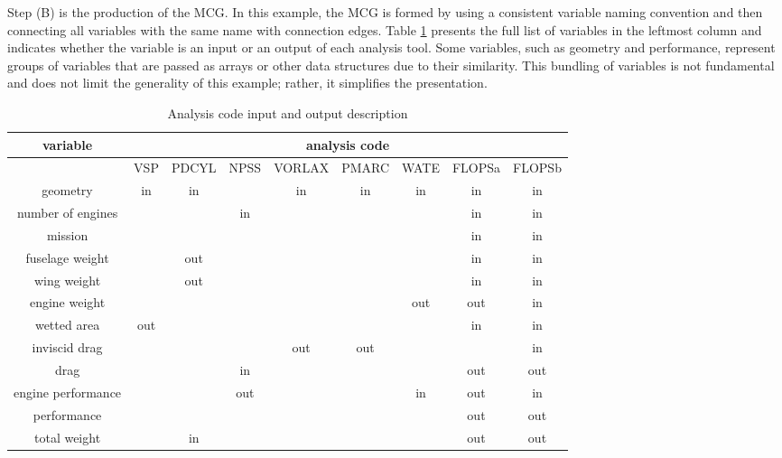 Step (B) is the production of the MCG.
	In this example, the MCG is formed by using a consistent variable naming convention and then connecting all variables with the same name with connection edges. 
	Table \ref{t:ins and outs} presents the full list of variables in the leftmost column and indicates whether the variable is an input or an output of each analysis tool. 
	Some variables, such as geometry and performance, represent groups of variables that are passed as arrays or other data structures due to their similarity. 
	This bundling of variables is not fundamental and does not limit the generality of this example; rather, it simplifies the presentation.
	\begin{table}[htb!]
	  \centering
	  \caption{Analysis code input and output description}
		\begin{tabular}{ccccccccc}
		\toprule
		variable & \multicolumn{8}{c}{analysis code} \\
		\midrule
			  & VSP   & PDCYL & NPSS  & VORLAX & PMARC & WATE  & FLOPSa & FLOPSb \\
		geometry & in    & in    &       & in    & in    & in    & in    & in \\
		number of engines &       &       & in    &       &       &       & in    & in \\
		mission &       &       &       &       &       &       & in    & in \\
		fuselage weight &       & out   &       &       &       &       & in    & in \\
		wing weight &       & out   &       &       &       &       & in    & in \\
		engine weight &       &       &       &       &       & out   & out   & in \\
		wetted area & out   &       &       &       &       &       & in    & in \\
		inviscid drag &       &       &       & out   & out   &       &       & in \\
		drag  &       &       & in    &       &       &       & out   & out \\
		engine performance &       &       & out   &       &       & in    & out   & in \\
		performance &       &       &       &       &       &       & out   & out \\
		total weight &       & in    &       &       &       &       & out   & out \\
		\bottomrule
		\end{tabular}
	  \label{t:ins and outs}
	\end{table}

